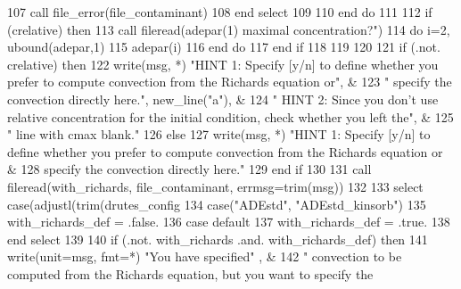 \begin{DoxyCode}
{{107            \textcolor{keyword}{call }file_error(file_contaminant)
108 \textcolor{keywordflow}{        end select}
109            
110 \textcolor{keywordflow}{       end do}
111        
112        \textcolor{keywordflow}{if} (crelative) \textcolor{keywordflow}{then}
113          \textcolor{keyword}{call  }fileread(adepar(1)%
       maximal concentration?"}\textcolor{comment}{)}
114 \textcolor{comment}{         }\textcolor{keywordflow}{do} i=2, ubound(adepar,1)
115           adepar(i)%
116 \textcolor{keywordflow}{         end do}
117 \textcolor{keywordflow}{       end if}
118        
119   
120        
121        \textcolor{keywordflow}{if} (.not. crelative) \textcolor{keywordflow}{then}
122         \textcolor{keyword}{write}(msg, *) \textcolor{stringliteral}{"HINT 1: Specify [y/n] to define whether you prefer to compute convection from the
       Richards equation or"}\textcolor{comment}{, &}
123 \textcolor{comment}{        }\textcolor{stringliteral}{" specify the convection directly here."}, new\_line(\textcolor{stringliteral}{"a"}), &
124          \textcolor{stringliteral}{"   HINT 2: Since you don't use relative concentration for the initial condition, check whether
       you left the"}\textcolor{comment}{, &}
125 \textcolor{comment}{        }\textcolor{stringliteral}{" line with cmax blank."}
126        \textcolor{keywordflow}{else}
127         \textcolor{keyword}{write}(msg, *) \textcolor{stringliteral}{"HINT 1: Specify [y/n] to define whether you prefer to compute convection from the
       Richards equation or &}
128 \textcolor{stringliteral}{}\textcolor{stringliteral}{         specify the convection directly here."}
129 \textcolor{keywordflow}{       end if}
130        
131        \textcolor{keyword}{call }fileread(with_richards, file_contaminant, errmsg=trim(msg))
132        
133        \textcolor{keywordflow}{select case}(adjustl(trim(drutes_config%
134          \textcolor{keywordflow}{case}(\textcolor{stringliteral}{"ADEstd"}, \textcolor{stringliteral}{"ADEstd\_kinsorb"})
135            with\_richards\_def = .false.
136 \textcolor{keywordflow}{         case default}
137            with\_richards\_def = .true.
138 \textcolor{keywordflow}{        end select}
139        
140        \textcolor{keywordflow}{if} (.not. with_richards .and. with\_richards\_def) \textcolor{keywordflow}{then}
141          \textcolor{keyword}{write}(unit=msg, fmt=*) \textcolor{stringliteral}{"You have specified"} , &
142               \textcolor{stringliteral}{" convection to be  computed from the Richards equation, but you want to specify the
}}
\end{DoxyCode}
